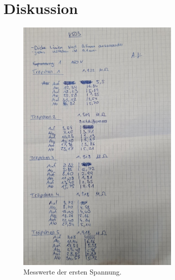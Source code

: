\section{Diskussion}
\label{sec:Diskussion}

\label{sec:Anhang}

\begin{figure}
    \centering
    \includegraphics[width=0.7\textwidth]{bilder/Spannung1.jpg}
    \caption{Messwerte der ersten Spannung.}
\end{figure}

